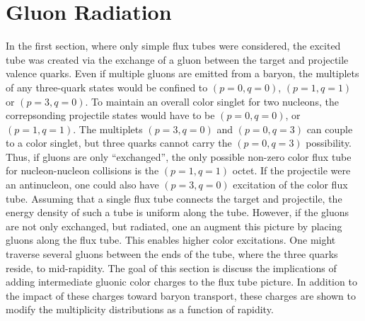 \documentclass[aps, prc, 12pt, nofootinbib, showpacs, superscriptaddress, tightenlines, groupedaddress]{revtex4-2}
\begin{document}
\section{Gluon Radiation}\label{sec:gluonradiation}

In the first section, where only simple flux tubes were considered, the excited tube was created via the exchange of a gluon between the target and projectile valence quarks. Even if multiple gluons are emitted from a baryon, the multiplets of any three-quark states would be confined to $(p=0,q=0)$, $(p=1,q=1)$ or $(p=3,q=0)$. To maintain an overall color singlet for two nucleons, the correpsonding projectile states would have to be $(p=0,q=0)$, or $(p=1,q=1)$. The multiplets $(p=3,q=0)$ and $(p=0,q=3)$ can couple to a color singlet, but three quarks cannot carry the $(p=0,q=3)$ possibility. Thus, if gluons are only ``exchanged'', the only possible non-zero color flux tube for nucleon-nucleon collisions is the $(p=1,q=1)$ octet. If the projectile were an antinucleon, one could also have $(p=3,q=0)$ excitation of the color flux tube. Assuming that a single flux tube connects the target and projectile, the energy density of such a tube is uniform along the tube. However, if the gluons are not only exchanged, but radiated, one an augment this picture by placing gluons along the flux tube. This enables higher color excitations. One might traverse several gluons between the ends of the tube, where the three quarks reside, to mid-rapidity. The goal of this section is discuss the implications of adding intermediate gluonic color charges to the flux tube picture. In addition to the impact of these charges toward baryon transport, these charges are shown to modify the multiplicity distributions as a function of rapidity. 
\end{document}
